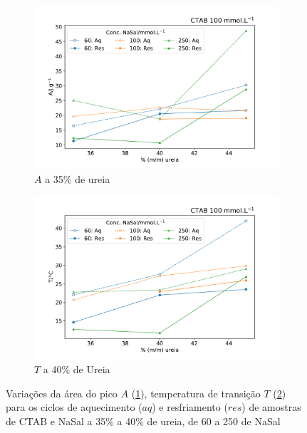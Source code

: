 	\begin{figure}[H]
		\centering
		\begin{subfigure}[t]{0.45\textwidth}
			\includegraphics[width=\textwidth]{./imagens/dsc/A_NaSal_c_UR_aq_res}
			\caption{$A$ a 35\% de ureia}
			\label{fig:DSC_A_NaSal}
		\end{subfigure} \qquad %
		\begin{subfigure}[t]{0.45\textwidth}
			\includegraphics[width=\textwidth]{./imagens/dsc/T_NaSal_c_UR_aq_res}
			\caption{$T$ a 40\% de Ureia}
			\label{fig:DSC_T_NaSal}
		\end{subfigure}
		
		\caption{Variações da área do pico $A$ (\ref{fig:DSC_A_NaSal}), temperatura de transição $T$ (\ref{fig:DSC_T_NaSal}) para os ciclos de aquecimento ($aq$) e resfriamento ($res$) de amostras de CTAB e NaSal a 35\% a 40\% de ureia, de 60 a 250 \mM{} de NaSal}
		\label{fig:DSC_propriedades_NaSal}
	\end{figure}
		
